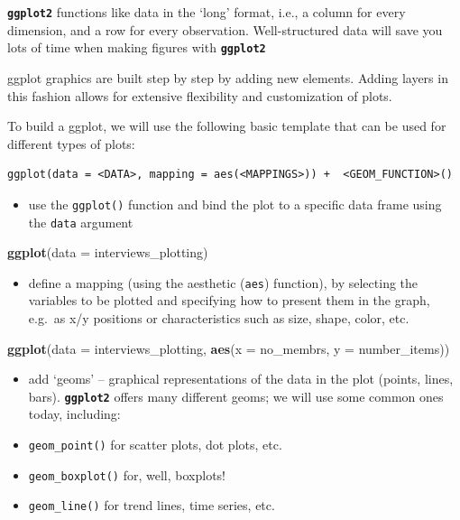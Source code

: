 \documentclass[]{book}
\newenvironment{Shaded}{\begin{snugshade}}{\end{snugshade}}
\newcommand{\KeywordTok}[1]{\textcolor[rgb]{0.13,0.29,0.53}{\textbf{#1}}}
\newcommand{\DataTypeTok}[1]{\textcolor[rgb]{0.13,0.29,0.53}{#1}}
\newcommand{\NormalTok}[1]{#1}
\providecommand{\tightlist}{%
  \setlength{\itemsep}{0pt}\setlength{\parskip}{0pt}}
\begin{document}
\textbf{\texttt{ggplot2}} functions like data in the `long' format,
i.e., a column for every dimension, and a row for every observation.
Well-structured data will save you lots of time when making figures with
\textbf{\texttt{ggplot2}}

ggplot graphics are built step by step by adding new elements. Adding
layers in this fashion allows for extensive flexibility and
customization of plots.

To build a ggplot, we will use the following basic template that can be
used for different types of plots:

\begin{verbatim}
ggplot(data = <DATA>, mapping = aes(<MAPPINGS>)) +  <GEOM_FUNCTION>()
\end{verbatim}

\begin{itemize}
\tightlist
\item
  use the \texttt{ggplot()} function and bind the plot to a specific
  data frame using the \texttt{data} argument
\end{itemize}

\begin{Shaded}
\begin{Highlighting}[]
\KeywordTok{ggplot}\NormalTok{(}\DataTypeTok{data =}\NormalTok{ interviews_plotting)}
\end{Highlighting}
\end{Shaded}

\begin{itemize}
\tightlist
\item
  define a mapping (using the aesthetic (\texttt{aes}) function), by
  selecting the variables to be plotted and specifying how to present
  them in the graph, e.g.~as x/y positions or characteristics such as
  size, shape, color, etc.
\end{itemize}

\begin{Shaded}
\begin{Highlighting}[]
\KeywordTok{ggplot}\NormalTok{(}\DataTypeTok{data =}\NormalTok{ interviews_plotting, }\KeywordTok{aes}\NormalTok{(}\DataTypeTok{x =}\NormalTok{ no_membrs, }\DataTypeTok{y =}\NormalTok{ number_items))}
\end{Highlighting}
\end{Shaded}

\begin{itemize}
\item
  add `geoms' -- graphical representations of the data in the plot
  (points, lines, bars). \textbf{\texttt{ggplot2}} offers many different
  geoms; we will use some common ones today, including:
\item
  \texttt{geom\_point()} for scatter plots, dot plots, etc.
\item
  \texttt{geom\_boxplot()} for, well, boxplots!
\item
  \texttt{geom\_line()} for trend lines, time series, etc.
\end{itemize}
\end{document}
